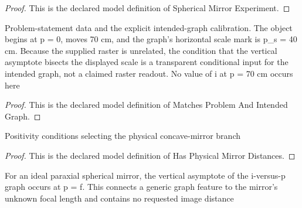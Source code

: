 \begin{proof}
  This is the declared model definition of Spherical Mirror Experiment.
\end{proof}
\begin{definition}
  \label{def:physics:phyx-mini-0442:phyxminiproblems-problemphyxmini0442-matchesproblemandintendedgraph}
  Problem-statement data and the explicit intended-graph calibration. The object begins at p = 0, moves 70 cm, and the graph's horizontal scale mark is p\_s = 40 cm. Because the supplied raster is unrelated, the condition that the vertical asymptote bisects the displayed scale is a transparent conditional input for the intended graph, not a claimed raster readout. No value of i at p = 70 cm occurs here
\end{definition}
\begin{proof}
  This is the declared model definition of Matches Problem And Intended Graph.
\end{proof}
\begin{definition}
  \label{def:physics:phyx-mini-0442:phyxminiproblems-problemphyxmini0442-hasphysicalmirrordistances}
  Positivity conditions selecting the physical concave-mirror branch
\end{definition}
\begin{proof}
  This is the declared model definition of Has Physical Mirror Distances.
\end{proof}
\begin{definition}
  \label{def:physics:phyx-mini-0442:phyxminiproblems-problemphyxmini0442-graphasymptoterepresentsfocaldistance}
  For an ideal paraxial spherical mirror, the vertical asymptote of the i-versus-p graph occurs at p = f. This connects a generic graph feature to the mirror's unknown focal length and contains no requested image distance
\end{definition}
